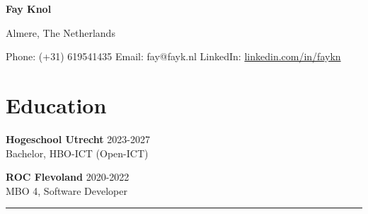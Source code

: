 \documentclass{article}
\begin{document}

\begin{center}
    \textbf{\Huge Fay Knol}

    \vspace{5pt}

    Almere, The Netherlands

    \vspace{5pt}

    Phone: (+31) 619541435 \quad Email: fay@fayk.nl \quad LinkedIn: \href{https://www.linkedin.com/in/faykn}{linkedin.com/in/faykn}
\end{center}

\noindent\makebox[\linewidth]{\rule{\paperwidth}{0.4pt}}

\section*{Education}
\textbf{Hogeschool Utrecht} \hfill 2023-2027 \\
Bachelor, HBO-ICT (Open-ICT)

\textbf{ROC Flevoland} \hfill 2020-2022 \\
MBO 4, Software Developer

\noindent\rule{\linewidth}{0.4pt}

\end{document}
